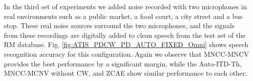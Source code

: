 \documentclass{article}
\begin{document}
%
%
%
%
In the third set of experiments we added noise recorded with two microphones in real environments  such as a public  market, a food court,   a city street and a bus stop.  These real noise sources surround the two microphones, and the signals from these recordings are digitally added to clean speech from the   test set of the RM database.  Fig.
\ref{fig:ATIS_PDCW_PD_AUTO_FIXED_Omni} shows speech recognition accuracy for this configuration. 
Again we observe that  MNCC-MNCV provides the best performance by a significant
margin, while the  Auto-ITD-Th, MNCC-MCNV without CW, and ZCAE show similar performance to each other.
%
%
\end{document}
